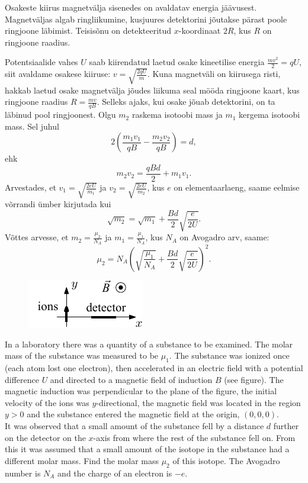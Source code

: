 {\ifHint
Osakeste kiirus magnetvälja sisenedes on avaldatav energia jäävusest. Magnetväljas algab ringliikumine, kusjuures detektorini jõutakse pärast poole ringjoone läbimist. Teisisõnu on detekteeritud $x$-koordinaat $2R$, kus $R$ on ringjoone raadius.
\fi


\ifSolution
Potentsiaalide vahes $U$ saab kiirendatud laetud osake kineetilise
energia $\frac{mv^{2}}{2}=qU$, siit avaldame osakese kiiruse: $v=\sqrt{\frac{2qU}{m}}$. Kuna magnetväli on kiirusega risti, hakkab laetud osake 
magnetvälja jõudes liikuma seal mööda ringjoone kaart, kus ringjoone raadius
$R=\frac{mv}{qB}$. Selleks ajaks, kui osake jõuab detektorini,
on ta läbinud pool ringjoonest. Olgu $m_{2}$ raskema isotoobi
mass ja $m_{1}$ kergema isotoobi mass. Sel juhul 
\[ 
2\left(\frac{m_{1}v_{1}}{qB}-\frac{m_{2}v_{2}}{qB}\right)=d, 
\]
ehk
\[ 
m_{2}v_{2}=\frac{qBd}{2}+m_{1}v_{1 }.
\]
Arvestades, et $v_{1}=\sqrt{\frac{2eU}{m_{1}}}$ ja $v_{2}=\sqrt{\frac{2eU}{m_{2}}}$,
kus $e$ on elementaarlaeng, saame eelmise võrrandi ümber kirjutada kui
\[ \sqrt{m_{2}}=\sqrt{m_{1}}+\frac{Bd}{2}\sqrt{\frac{e}{2U}}. \]
Võttes arvesse, et $m_{2}=\frac{\mu_{2}}{N_{A}}$ ja $m_{1}=\frac{\mu_{1}}{N_{A}}$,
kus $N_{A}$ on Avogadro arv, saame:
\[ \mu_{2}=N_{A}\left(\sqrt{\frac{\mu_{1}}{N_{A}}}+\frac{Bd}{2}\sqrt{\frac{e}{2U}}\right)^{2}.\]
\fi


\ifEngStatement
\begin{figure}%
\includegraphics[width=\linewidth]{2013-v2g-10-massspektromeeter_ipe_ing}%
\end{figure}
In a laboratory there was a quantity of a substance to be examined. The molar mass of the substance was measured to be $\mu_{1}$. The substance was ionized once (each atom lost one electron), then accelerated in an electric field with a potential difference $U$ and directed to a magnetic field of induction $B$ (see figure). The magnetic induction was perpendicular to the plane of the figure, the initial velocity of the ions was $y$-directional, the magnetic field was located in the region $y>0$ and the substance entered the magnetic field at the origin, $(0, 0, 0)$.\\
It was observed that a small amount of the substance fell by a distance $d$ further on the detector on the $x$-axis from where the rest of the substance fell on. From this it was assumed that a small amount of the isotope in the substance had a different molar mass. Find the molar mass $\mu_{2}$ of this isotope. The Avogadro number is $N_A$ and the charge of an electron is $-e$.
\fi


}
